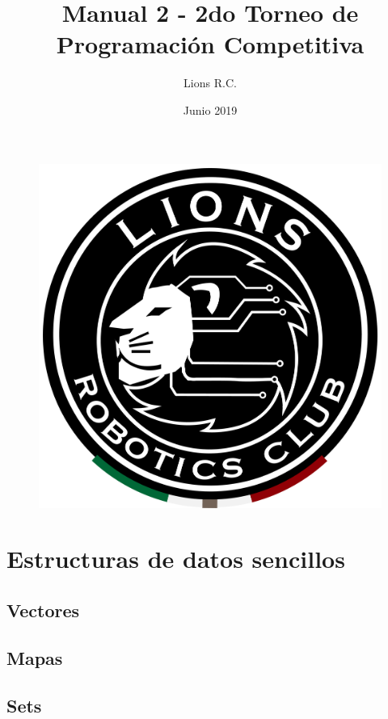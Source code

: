\documentclass{article}
\title{Manual 2 - 2do Torneo de Programación Competitiva}
\author{Lions R.C.}
\date{Junio 2019}
\begin{document}
\maketitle

\tableofcontents

\begin{figure}[H]
    \centering
    \includegraphics[width=0.2\paperwidth]{newblack}
\end{figure}

\section{Estructuras de datos sencillos}

\subsection{Vectores}

\subsection{Mapas}

\subsection{Sets}
\end{document}
